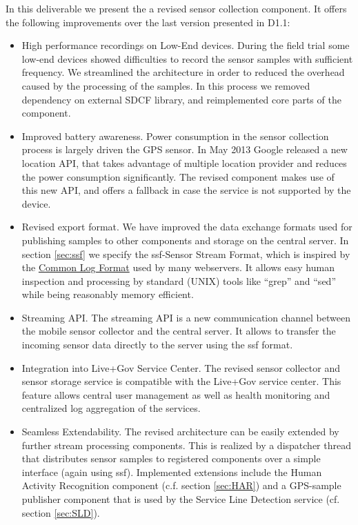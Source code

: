 In this deliverable we present the a revised sensor collection
component. It offers the following improvements over the last version
presented in D1.1:
\begin{itemize}
\item High performance recordings on Low-End devices. During the field
  trial some low-end devices showed difficulties to record the sensor
  samples with sufficient frequency. We streamlined the architecture
  in order to reduced the overhead caused by the processing of the
  samples. In this process we removed dependency on external SDCF
  library, and reimplemented core parts of the component.
\item Improved battery awareness. Power consumption in the sensor
  collection process is largely driven the GPS sensor. In May 2013
  Google released a new location API, that takes advantage of multiple
  location provider and reduces the power consumption significantly.
  The revised component makes use of this new API, and offers a
  fallback in case the service is not supported by the device.
\item Revised export format. We have improved the data exchange
  formats used for publishing samples to other components and storage
  on the central server. In section \ref{sec:ssf} we specify the
  ssf-Sensor Stream Format, which is inspired by the
  \href{http://en.wikipedia.org/wiki/Common\_Log\_Format}{Common Log
    Format} used by many webservers. It allows easy human inspection
  and processing by standard (UNIX) tools like ``grep'' and ``sed''
  while being reasonably memory efficient.
\item Streaming API. The streaming API is a new communication channel
  between the mobile sensor collector and the central server. It
  allows to transfer the incoming sensor data directly to the server
  using the ssf format.
\item Integration into Live+Gov Service Center. The revised sensor
  collector and sensor storage service is compatible with the Live+Gov
  service center. This feature allows central user management as well
  as health monitoring and centralized log aggregation of the services.
\item Seamless Extendability. The revised architecture can be easily
  extended by further stream processing components. This is realized
  by a dispatcher thread that distributes sensor samples to registered
  components over a simple interface (again using ssf). Implemented
  extensions include the Human Activity Recognition component
  (c.f. section \ref{sec:HAR}) and a GPS-sample publisher component
  that is used by the Service Line Detection service (cf. section
  \ref{sec:SLD}).
\end{itemize}

